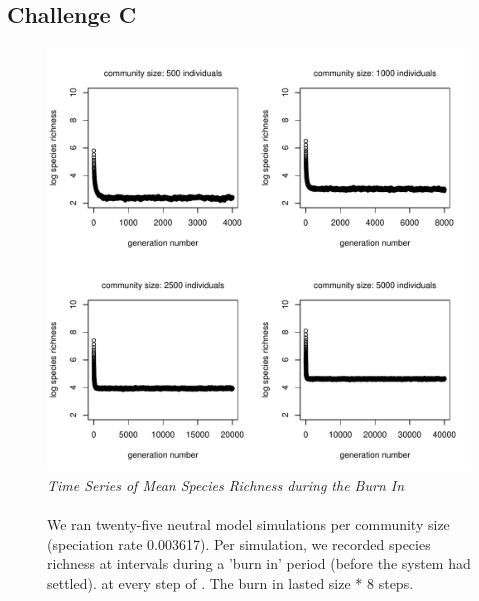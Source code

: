 \documentclass[11pt]{article}
\begin{document}
\subsection*{Challenge C}
\begin{figure}[h]
\centering
\includegraphics[width=0.8\linewidth]{../Results/Challenge_C.pdf}
\caption{\emph{Time Series of Mean Species Richness during the Burn In}\\\\
We ran twenty-five neutral model simulations per community size (speciation rate 0.003617). Per simulation, we recorded species richness at intervals during a 'burn in' period (before the system had settled).
at every step of . The burn in lasted size * 8 steps.}
\end{figure}

\newpage

\end{document}
